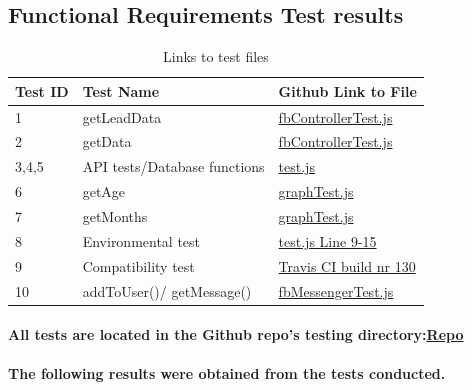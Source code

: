 \documentclass{article}
\begin{document}
\subsection{Functional Requirements Test results}
\begin{table}[H]
\centering
\label{link_table}
\begin{tabular}{|l|l|l|}
\hline
Test ID    & Test Name   & Github Link to File \\ \hline \hline
1          & getLeadData &  \href{https://github.com/QuintonWeenink/ValknutSolutions/blob/develop/test/integration/fbControllerTest.js}{fbControllerTest.js}         \\ \hline
2          & getData  &  \href{https://github.com/QuintonWeenink/ValknutSolutions/blob/develop/test/integration/fbControllerTest.js}{fbControllerTest.js}       \\ \hline
3,4,5      & API tests/Database functions & \href{https://github.com/QuintonWeenink/ValknutSolutions/blob/develop/test/api/test.js}{test.js}         \\ \hline
6          & getAge    & \href{https://github.com/QuintonWeenink/ValknutSolutions/blob/develop/test/graphTest.js}{graphTest.js} \\ \hline
7          & getMonths  & \href{https://github.com/QuintonWeenink/ValknutSolutions/blob/develop/test/graphTest.js}{graphTest.js} \\ \hline 
8          &  Environmental test  & \href{https://github.com/QuintonWeenink/ValknutSolutions/blob/develop/test/test.js}{test.js Line 9-15}\\ \hline
9		   & Compatibility test & \href{https://travis-ci.com/QuintonWeenink/ValknutSolutions/builds/30866212}{Travis CI build nr 130} \\ \hline
10		   & addToUser()/ getMessage() & \href{https://github.com/QuintonWeenink/ValknutSolutions/blob/develop/test/fbMessengerTest.js}{fbMessengerTest.js}   \\ \hline
\end{tabular}
\caption{Links to test files}
\end{table}
\paragraph{All tests are located in the Github repo's testing directory:\href{https://github.com/QuintonWeenink/ValknutSolutions}{Repo}}

\paragraph{The following results were obtained from the tests conducted.}
\end{document}
